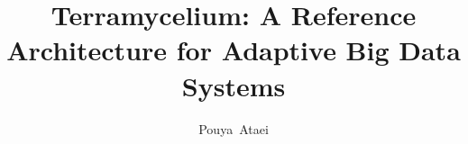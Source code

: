 \documentclass[journal]{IEEEtran}
\begin{document}
%
\title{Terramycelium: A Reference Architecture for Adaptive Big Data Systems}
%
%
%

\author{Pouya~Ataei}%


% 
%



% 
\end{document}
